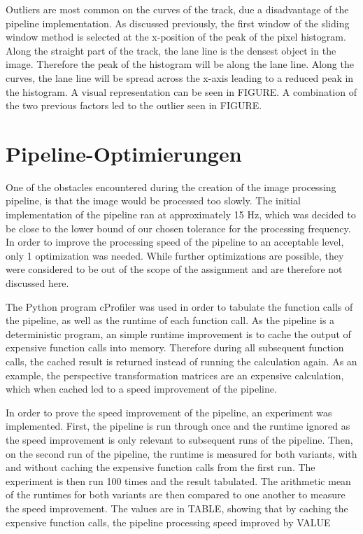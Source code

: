 \documentclass[arbeit=studie,oneside,BCOR=12mm]{ArbeitRST}
\begin{document}
Outliers are most common on the curves of the track, due a disadvantage of the
pipeline implementation. As discussed previously, the first window of the
sliding window method is selected at the x-position of the peak of the pixel
histogram. Along the straight part of the track, the lane line is the densest
object in the image. Therefore the peak of the histogram will be along the lane
line. Along the curves, the lane line will be spread across the x-axis leading
to a reduced peak in the histogram. A visual representation can be seen in
FIGURE. A combination of the two previous factors led to the outlier seen in
FIGURE.




\section{Pipeline-Optimierungen}

One of the obstacles encountered during the creation of the image processing
pipeline, is that the image would be processed too slowly. The initial
implementation of the pipeline ran at approximately 15 Hz, which was decided to
be close to the lower bound of our chosen tolerance for the processing
frequency. In order to improve the processing speed of the pipeline to an
acceptable level, only 1 optimization was needed. While further optimizations
are possible, they were considered to be out of the scope of the assignment and
are therefore not discussed here.

The Python program cProfiler was used in order to tabulate the function calls
of the pipeline, as well as the runtime of each function call. As the pipeline
is a deterministic program, an simple runtime improvement is to cache the
output of expensive function calls into memory. Therefore during all subsequent
function calls, the cached result is returned instead of running the
calculation again. As an example, the perspective transformation matrices are
an expensive calculation, which when cached led to a speed improvement of the
pipeline.

In order to prove the speed improvement of the pipeline, an experiment was
implemented. First, the pipeline is run through once and the runtime ignored as
the speed improvement is only relevant to subsequent runs of the pipeline.
Then, on the second run of the pipeline, the runtime is measured for both
variants, with and without caching the expensive function calls from the first
run. The experiment is then run 100 times and the result tabulated. The
arithmetic mean of the runtimes for both variants are then compared to one
another to measure the speed improvement. The values are in TABLE, showing that
by caching the expensive function calls, the pipeline processing speed improved
by VALUE%
\end{document}

